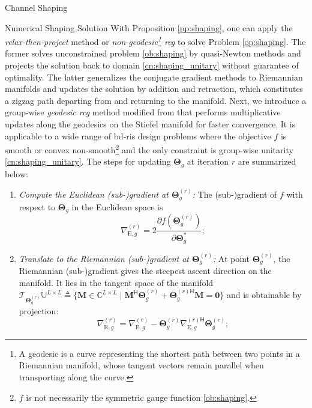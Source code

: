 \documentclass[journal]{IEEEtran}
\begin{document}
\begin{section}{Channel Shaping}
\begin{subsection}{Numerical Shaping Solution}
		With Proposition \ref{pp:shaping}, one can apply the \emph{relax-then-project} method \cite{Shen2020a,Fang2023} or \emph{non-geodesic\footnote{A geodesic is a curve representing the shortest path between two points in a Riemannian manifold, whose tangent vectors remain parallel when transporting along the curve.} \gls{rcg}} \cite{Li2023b,Li2023c,Zhou2023} to solve Problem \eqref{op:shaping}.
		The former solves unconstrained problem \eqref{ob:shaping} by quasi-Newton methods and projects the solution back to domain \eqref{cn:shaping_unitary} without guarantee of optimality.
		The latter generalizes the conjugate gradient methods to Riemannian manifolds and updates the solution by addition and retraction, which constitutes a zigzag path departing from and returning to the manifold.
		Next, we introduce a group-wise \emph{geodesic \gls{rcg}} method modified from \cite{Abrudan2008,Abrudan2009} that performs multiplicative updates along the geodesics on the Stiefel manifold for faster convergence.
		It is applicable to a wide range of \gls{bd}-\gls{ris} design problems where the objective $f$ is smooth or convex non-smooth\footnote{$f$ is not necessarily the symmetric gauge function \eqref{ob:shaping}.} and the only constraint is group-wise unitarity \eqref{cn:shaping_unitary}.
		The steps for updating $\mathbf{\Theta}_g$ at iteration $r$ are summarized below:
		\begin{enumerate}
			\item \emph{Compute the Euclidean (sub-)gradient at $\mathbf{\Theta}_g^{(r)}$:} The (sub-)gradient of $f$ with respect to $\mathbf{\Theta}_g$ in the Euclidean space is
				\begin{equation}
					\label{eq:gradient_eucl}
					\nabla_{\mathrm{E},g}^{(r)} = 2 \frac{\partial f(\mathbf{\Theta}_g^{(r)})}{\partial \mathbf{\Theta}_g^*};
				\end{equation}
			\item \emph{Translate to the Riemannian (sub-)gradient at $\mathbf{\Theta}_g^{(r)}$:} At point $\mathbf{\Theta}_g^{(r)}$, the Riemannian (sub-)gradient gives the steepest ascent direction on the manifold. It lies in the tangent space of the manifold $\mathcal{T}_{\mathbf{\Theta}_g^{(r)}}\mathbb{U}^{L \times L} \triangleq \{\mathbf{M} \in \mathbb{C}^{L \times L} \mid \mathbf{M}^\mathsf{H} \mathbf{\Theta}_g^{(r)} + {\mathbf{\Theta}_g^{(r)\mathsf{H}}} \mathbf{M} = \mathbf{0}\}$ and is obtainable by projection:
				\begin{equation}
					\label{eq:gradient_riem}
					\nabla_{\mathrm{R},g}^{(r)} = \nabla_{\mathrm{E},g}^{(r)} - \mathbf{\Theta}_g^{(r)} {\nabla_{\mathrm{E},g}^{(r)\mathsf{H}}} \mathbf{\Theta}_g^{(r)};

\end{equation}
\end{enumerate}
\end{subsection}
\end{section}
\end{document}
